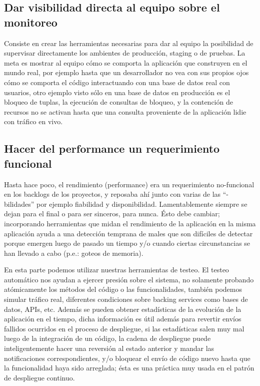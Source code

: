\documentclass[conference]{IEEEtran}
\begin{document}
\subsection{Dar visibilidad directa al equipo sobre el monitoreo}

Consiste en crear las herramientas necesarias para dar al equipo la posibilidad de supervisar directamente los ambientes de producción, staging o de pruebas. La meta es mostrar al equipo cómo se comporta la aplicación que construyen en el mundo real, por ejemplo hasta que un desarrollador no vea con sus propios ojos cómo se comporta el código interactuando con una base de datos real con usuarios, otro ejemplo visto sólo en una base de datos en producción es el bloqueo de tuplas, la ejecución de consultas de bloqueo, y la contención de recursos no se activan hasta que una consulta proveniente de la aplicación lidie con tráfico en vivo.

\subsection{Hacer del performance un requerimiento funcional}

Hasta hace poco, el rendimiento (performance) era un requerimiento no-funcional en los backlogs de los proyectos, y reposaba ahí junto con varias de las “-bilidades” por ejemplo fiabilidad y disponibilidad. Lamentablemente siempre se dejan para el final o para ser sinceros, para nunca. Ésto debe cambiar; incorporando herramientas que midan el rendimiento de la aplicación en la misma aplicación ayuda a una detección temprana de males que son difíciles de detectar porque emergen luego de pasado un tiempo y/o cuando ciertas circunstancias se han llevado a cabo (p.e.: goteos de memoria). 

En esta parte podemos utilizar nuestras herramientas de testeo. El testeo automático nos ayudan a ejercer presión sobre el sistema, no solamente probando atómicamente los métodos del código o las funcionalidades,  también podemos simular tráfico real, diferentes condiciones sobre backing services como bases de datos, APIs, etc. Además se pueden obtener estadísticas de la evolución de la aplicación en el tiempo, dicha información es útil además para revertir envíos fallidos ocurridos en el proceso de despliegue, si las estadísticas salen muy mal luego de la integración de un código, la cadena de despliegue puede inteligentemente hacer una reversión al estado anterior y mandar las notificaciones correspondientes, y/o bloquear el envío de código nuevo hasta que la funcionalidad haya sido arreglada; ésta es una práctica muy usada en el patrón de despliegue continuo.
\end{document}

